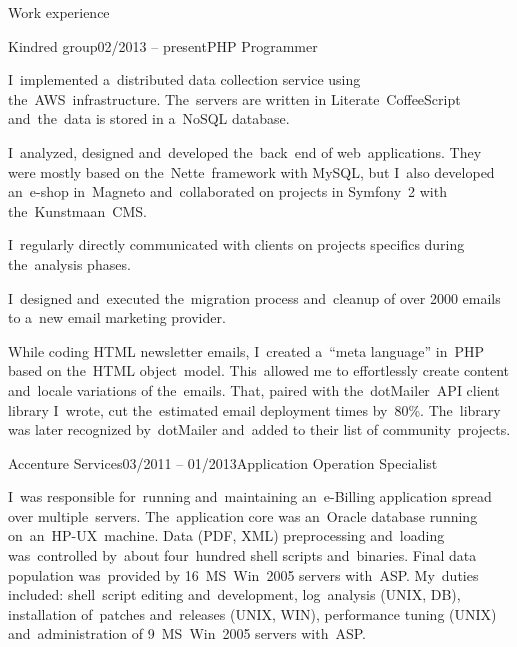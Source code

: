 \documentclass{resume}
\begin{document}
    \begin{rSection}{Work experience}

        \begin{rSubsection}{Kindred group}{02/2013 -- present}{PHP Programmer}{}

            \item I~implemented a~distributed data collection service using the~AWS~infrastructure.
            The~servers are written in Literate~CoffeeScript and~the~data is stored in a~NoSQL database.

            \item I~analyzed, designed and~developed the~back~end of web~applications.
            They were mostly based on the~Nette~framework with MySQL,
            but I~also developed an~e-shop in~Magneto and~collaborated on projects in Symfony~2 with the~Kunstmaan~CMS.

            \item I~regularly directly communicated with clients on projects specifics during the~analysis phases.

            \item I~designed and~executed the~migration process and~cleanup of over 2000 emails to a~new email marketing provider.

            \item While coding HTML newsletter emails, I~created a~“meta language” in~PHP based on the~HTML object~model.
            This~allowed me to effortlessly create content and~locale variations of the~emails.
            That, paired with the~dotMailer~API client library I~wrote, cut the~estimated email deployment times by~80\%.
            The~library was later recognized by~dotMailer and~added to their list of community~projects.
        \end{rSubsection}

        \begin{rSubsection}{Accenture Services}{03/2011 -- 01/2013}{Application Operation Specialist}{}
            \item I~was responsible for~running and~maintaining an~e-Billing application spread over multiple~servers.
            The~application core was an~Oracle database running on~an~HP-UX~machine.
            Data (PDF, XML) preprocessing and~loading was~controlled by~about four~hundred shell scripts and~binaries.
            Final data population was~provided by 16~MS~Win~2005 servers with~ASP.
            My~duties included: shell~script editing and~development, log~analysis (UNIX, DB),
            installation of~patches and~releases (UNIX, WIN), performance tuning (UNIX)
            and~administration of 9~MS~Win~2005 servers with~ASP.


\end{rSubsection}
\end{rSection}
\end{document}
